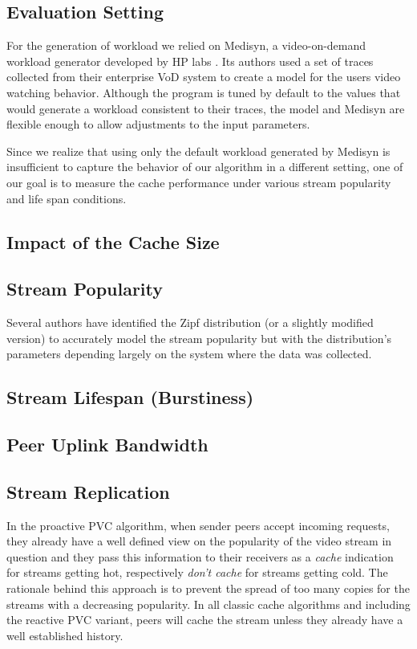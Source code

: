 \documentclass{acm_proc_article-sp}
\begin{document}
\subsection{Evaluation Setting}

For the generation of workload we relied on Medisyn, a video-on-demand workload generator developed by HP labs \cite{tang2003medisyn}. Its authors used a set of traces collected from their enterprise VoD system to create a model for the users video watching behavior. Although the program is tuned by default to the values that would generate a workload consistent to their traces, the model and Medisyn are flexible enough to allow adjustments to the input parameters.

Since we realize that using only the default workload generated by Medisyn is insufficient to capture the behavior of our algorithm in a different setting, one of our goal is to measure the cache performance under various stream popularity and life span conditions.

\subsection{Impact of the Cache Size}

\subsection{Stream Popularity}

Several authors have identified the Zipf distribution (or a slightly modified version) to accurately model the stream popularity \cite{tang2003medisyn,yu2006understanding} but with the distribution's parameters depending largely on the system where the data was collected.

\subsection{Stream Lifespan (Burstiness)}

\subsection{Peer Uplink Bandwidth}

\subsection{Stream Replication}

In the proactive PVC algorithm, when sender peers accept incoming requests, they already have a well defined view on the popularity of the video stream in question and they pass this information to their receivers as a \emph{cache} indication for streams getting hot, respectively \emph{don't cache} for streams getting cold. The rationale behind this approach is to prevent the spread of too many copies for the streams with a decreasing popularity. In all classic cache algorithms and including the reactive PVC variant, peers will cache the stream unless they already have a well established history.
\end{document}
